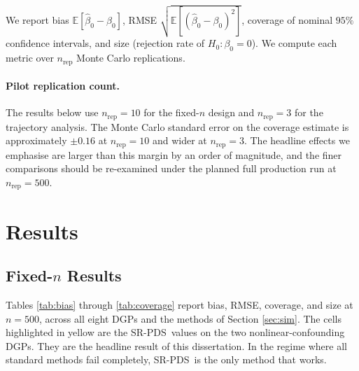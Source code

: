 \documentclass[11pt, a4paper]{article}
\theoremstyle{plain}
\theoremstyle{definition}
\theoremstyle{remark}
\newcommand{\epds}{\textsc{SR-PDS}}
\newcommand{\E}{\mathbb{E}}
\newcommand{\betahat}{\hat{\beta}_0}
\begin{document}
We report bias $\E[\betahat - \beta_0]$, RMSE $\sqrt{\E[(\betahat
- \beta_0)^2]}$, coverage of nominal $95\%$ confidence intervals,
and size (rejection rate of $H_0: \beta_0 = 0$). We compute each
metric over $n_{\text{rep}}$ Monte Carlo replications.

\paragraph{Pilot replication count.} The results below use
$n_{\text{rep}} = 10$ for the fixed-$n$ design and $n_{\text{rep}}
= 3$ for the trajectory analysis. The Monte Carlo standard error
on the coverage estimate is approximately $\pm 0.16$ at
$n_{\text{rep}} = 10$ and wider at $n_{\text{rep}} = 3$. The headline effects we emphasise are larger than this margin by
an order of magnitude, and the finer comparisons should be
re-examined under the planned full production run at
$n_{\text{rep}} = 500$.

\section{Results}
\label{sec:results}

\subsection{Fixed-$n$ Results}

Tables \ref{tab:bias} through \ref{tab:coverage} report bias, RMSE,
coverage, and size at $n=500$, across all eight DGPs and the
methods of Section \ref{sec:sim}. The cells highlighted in
yellow are the \epds\ values on the two nonlinear-confounding
DGPs. They are the headline result of this dissertation. In the
regime where all standard methods fail completely, \epds\ is the
only method that works.
\end{document}
